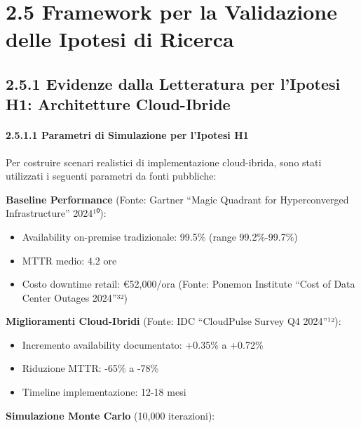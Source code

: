 \documentclass[12pt,a4paper,oneside]{book}
\providecommand{\tightlist}{%
  \setlength{\itemsep}{0pt}\setlength{\parskip}{0pt}
}
\numberwithin{figure}{chapter} %
\numberwithin{table}{chapter}  %
\begin{document}
\section{2.5 Framework per la Validazione delle Ipotesi di
Ricerca}\label{framework-per-la-validazione-delle-ipotesi-di-ricerca}

\subsection{2.5.1 Evidenze dalla Letteratura per l'Ipotesi H1:
Architetture
Cloud-Ibride}\label{evidenze-dalla-letteratura-per-lipotesi-h1-architetture-cloud-ibride}

\paragraph{2.5.1.1 Parametri di Simulazione per l'Ipotesi
H1}\label{parametri-di-simulazione-per-lipotesi-h1}

Per costruire scenari realistici di implementazione cloud-ibrida, sono
stati utilizzati i seguenti parametri da fonti pubbliche:

\textbf{Baseline Performance} (Fonte: Gartner ``Magic Quadrant for
Hyperconverged Infrastructure'' 2024¹⁰):

\begin{itemize}
\tightlist
\item
  Availability on-premise tradizionale: 99.5\% (range 99.2\%-99.7\%)\\
\item
  MTTR medio: 4.2 ore\\
\item
  Costo downtime retail: €52,000/ora (Fonte: Ponemon Institute ``Cost of
  Data Center Outages 2024''³²)
\end{itemize}

\textbf{Miglioramenti Cloud-Ibridi} (Fonte: IDC ``CloudPulse Survey Q4
2024''¹²):

\begin{itemize}
\tightlist
\item
  Incremento availability documentato: +0.35\% a +0.72\%\\
\item
  Riduzione MTTR: -65\% a -78\%\\
\item
  Timeline implementazione: 12-18 mesi
\end{itemize}

\textbf{Simulazione Monte Carlo} (10,000 iterazioni):
\end{document}

